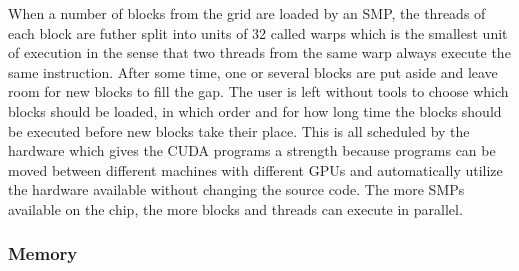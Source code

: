 When a number of blocks from the grid are loaded by an SMP, the threads of each block are futher split into units of 32 called warps which is the smallest unit of execution in the sense that two threads from the same warp always execute the same instruction. After some time, one or several blocks are put aside and leave room for new blocks to fill the gap. The user is left without tools to choose which blocks should be loaded, in which order and for how long time the blocks should be executed before new blocks take their place. This is all scheduled by the hardware which gives the CUDA programs a strength because programs can be moved between different machines with different GPUs and automatically utilize the hardware available without changing the source code. The more SMPs available on the chip, the more blocks and threads can execute in parallel.

\subsubsection{Memory}